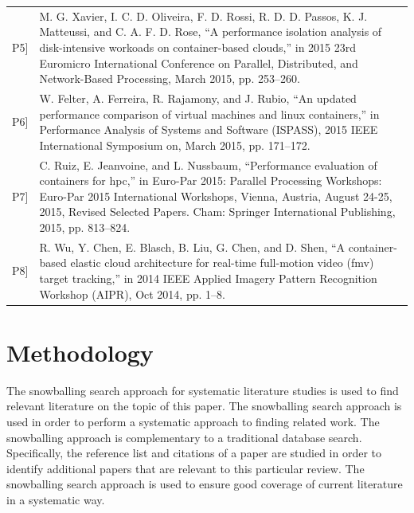 \begin{table}[ht]
\begin{tabular}{| >{\centering}m{1.3cm} |>{\arraybackslash}m{12.7cm}|}
{[}P5{]}  & M. G. Xavier, I. C. D. Oliveira, F. D. Rossi, R. D. D. Passos, K. J. Matteussi, and C. A. F. D. Rose, “A performance isolation analysis of disk-intensive workoads on container-based clouds,” in 2015 23rd Euromicro International Conference on Parallel, Distributed, and Network-Based Processing, March 2015, pp. 253–260. \\
{[}P6{]}  & W. Felter, A. Ferreira, R. Rajamony, and J. Rubio, “An updated performance comparison of virtual machines and linux containers,” in Performance Analysis of Systems and Software (ISPASS), 2015 IEEE International Symposium on, March 2015, pp. 171–172.                                                                            \\
{[}P7{]}  & C. Ruiz, E. Jeanvoine, and L. Nussbaum, “Performance evaluation of containers for hpc,” in Euro-Par 2015: Parallel Processing Workshops: Euro-Par 2015 International Workshops, Vienna, Austria, August 24-25, 2015, Revised Selected Papers. Cham: Springer International Publishing, 2015, pp. 813–824. \\
{[}P8{]}  & R. Wu, Y. Chen, E. Blasch, B. Liu, G. Chen, and D. Shen, “A container-based elastic cloud architecture for real-time full-motion video (fmv) target tracking,” in 2014 IEEE Applied Imagery Pattern Recognition Workshop (AIPR), Oct 2014, pp. 1–8. \\ \hline
\end{tabular}
\end{table}


\section{Methodology}
The snowballing search approach for systematic literature studies is used to find relevant literature on the topic of this paper. The snowballing search approach is used in order to perform a systematic approach to finding related work. The snowballing approach is complementary to a traditional database search. Specifically, the reference list and citations of a paper are studied in order to identify additional papers that are relevant to this particular review. The snowballing search approach is used to ensure good coverage of current literature in a systematic way.\\

